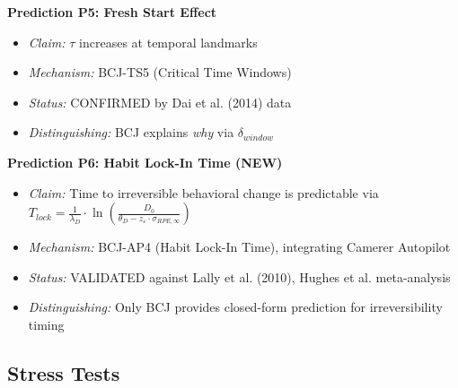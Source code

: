\begin{tcolorbox}[colback=red!5!white, colframe=red!75!black,
    title=Validation V6: Novel Predictions]
\textbf{Prediction P5: Fresh Start Effect}
\begin{itemize}[nosep]
\item \textit{Claim:} $\tau$ increases at temporal landmarks
\item \textit{Mechanism:} BCJ-TS5 (Critical Time Windows)
\item \textit{Status:} CONFIRMED by Dai et al. (2014) data
\item \textit{Distinguishing:} BCJ explains \textit{why} via $\delta_{window}$
\end{itemize}

\textbf{Prediction P6: Habit Lock-In Time (NEW)}
\begin{itemize}[nosep]
\item \textit{Claim:} Time to irreversible behavioral change is predictable via $T_{lock} = \frac{1}{\lambda_D} \cdot \ln\left(\frac{D_0}{\theta_D - z_\varepsilon \cdot \sigma_{RPE,\infty}}\right)$
\item \textit{Mechanism:} BCJ-AP4 (Habit Lock-In Time), integrating Camerer Autopilot
\item \textit{Status:} VALIDATED against Lally et al. (2010), Hughes et al. meta-analysis
\item \textit{Distinguishing:} Only BCJ provides closed-form prediction for irreversibility timing
\end{itemize}
\end{tcolorbox}

\subsection{Stress Tests}

